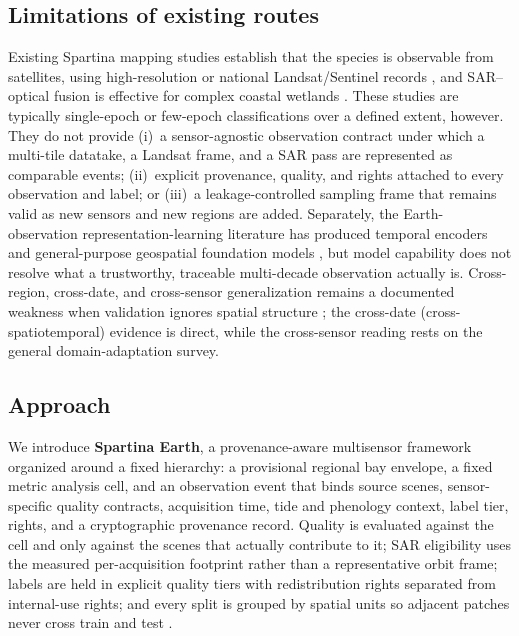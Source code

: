 \subsection{Limitations of existing routes}
Existing Spartina mapping studies establish that the species is
observable from satellites, using high-resolution
\citep{ai2017phenology,liu2017monitoring} or national Landsat/Sentinel
records \citep{liu2018rapid,mao2019rapid,yan2023monitoring}, and
SAR--optical fusion is effective for complex coastal wetlands
\citep{jamali2022swin}. These studies are typically single-epoch or
few-epoch classifications over a defined extent, however. They do not
provide (i)~a sensor-agnostic observation contract under which a
multi-tile datatake, a Landsat frame, and a SAR pass are represented as
comparable events; (ii)~explicit provenance, quality, and rights
attached to every observation and label; or (iii)~a leakage-controlled
sampling frame that remains valid as new sensors and new regions are
added. Separately, the Earth-observation representation-learning
literature has produced temporal encoders
\citep{russwurm2020selfattn,garnot2020pixelset,yuan2022sitsformer} and
general-purpose geospatial foundation models
\citep{cong2022satmae,fuller2023croma,jakubik2024prithvi,xiong2024dofa},
but model capability does not resolve what a trustworthy, traceable
multi-decade observation actually is. Cross-region, cross-date, and
cross-sensor generalization remains a documented weakness when
validation ignores spatial structure
\citep{tuia2016da,luo2022crossspatiotemporal,ploton2020spatial}; the
cross-date (cross-spatiotemporal) evidence is direct, while the
cross-sensor reading rests on the general domain-adaptation survey.

\subsection{Approach}
We introduce \textbf{Spartina Earth}, a provenance-aware multisensor
framework organized around a fixed hierarchy: a provisional
regional bay envelope, a fixed metric analysis cell, and an
observation event that binds source scenes, sensor-specific quality
contracts, acquisition time, tide and phenology context, label tier,
rights, and a cryptographic provenance record. Quality is evaluated
against the cell and only against the scenes that actually contribute
to it; SAR eligibility uses the measured per-acquisition footprint
rather than a representative orbit frame; labels are held in explicit
quality tiers with redistribution rights separated from internal-use
rights; and every split is grouped by spatial units so adjacent
patches never cross train and test \citep{roberts2017cv,gebru2021datasheets,mitchell2019modelcards}.

